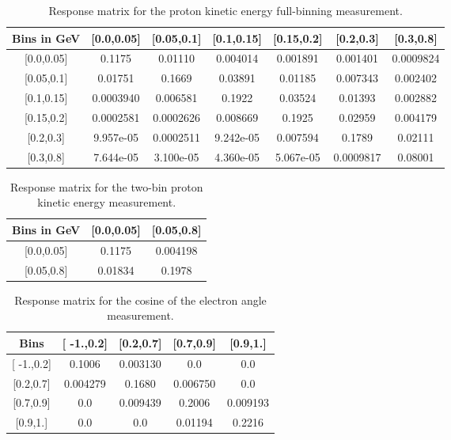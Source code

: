 \documentclass[amsmath,amssymb,aps,prd,showpacs,twocolumn,superscriptaddress,letterpaper,longbibliography, floatfix]{revtex4-2}
\begin{document}
\begin{table}[H]
\caption{Response matrix for the proton kinetic energy full-binning measurement.} \label{tbl:RepPe}
\begin{center} \begin{tabular}{|c|c|c|c|c|c|c|}
\hline
Bins in GeV & [0.0,0.05] & [0.05,0.1]& [0.1,0.15]& [0.15,0.2]& [0.2,0.3]& [0.3,0.8]\\\hline
{[0.0,0.05]} &  0.1175& 0.01110& 0.004014& 0.001891& 0.001401& 0.0009824 \\
{[0.05,0.1]}  &0.01751& 0.1669& 0.03891& 0.01185& 0.007343& 0.002402  \\
{[0.1,0.15]}  &0.0003940& 0.006581& 0.1922& 0.03524& 0.01393& 0.002882  \\
{[0.15,0.2]}  &0.0002581& 0.0002626&0.008669& 0.1925& 0.02959& 0.004179  \\
{[0.2,0.3]}  &9.957e-05& 0.0002511& 9.242e-05 &0.007594& 0.1789& 0.02111  \\
{[0.3,0.8]}  &7.644e-05 &3.100e-05& 4.360e-05 &5.067e-05 &0.0009817& 0.08001 \\
\hline
\end{tabular} \end{center}
\end{table}
\FloatBarrier
\begin{table}[H]
\caption{Response matrix for the two-bin proton kinetic energy measurement.} \label{tbl:RepPe2}
\begin{center} \begin{tabular}{|c|c|c|}
\hline
Bins in GeV & [0.0,0.05] & [0.05,0.8]\\ \hline
{[0.0,0.05]} &  0.1175 &0.004198		\\
{[0.05,0.8]}  &0.01834 &0.1978  \\
\hline
\end{tabular} \end{center}
\end{table}
\FloatBarrier
\begin{table}[H]
\caption{Response matrix for the cosine of the electron angle measurement.} \label{tbl:RepAe}
\begin{center} \begin{tabular}{|c|c|c|c|c|}
\hline
Bins & [ -1.,0.2] & [0.2,0.7]& [0.7,0.9]& [0.9,1.]\\\hline
{[ -1.,0.2]} &  0.1006& 0.003130& 0.0 &0.0 		\\
{[0.2,0.7]}  &0.004279& 0.1680& 0.006750& 0.0    \\
{[0.7,0.9]}  &0.0 &0.009439& 0.2006& 0.009193    \\
{[0.9,1.]}  &0.0& 0.0 &0.01194& 0.2216 \\
\hline
\end{tabular} \end{center}
\end{table}
\end{document}
